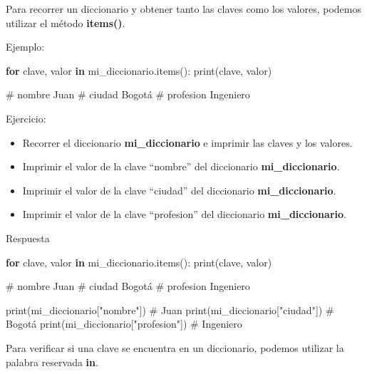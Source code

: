 \documentclass[
  a4paper,
  DIV=11,
  numbers=noendperiod,
  onepage,
  openany]{scrreprt}
\newenvironment{Shaded}{\begin{snugshade}}{\end{snugshade}}
\newcommand{\BuiltInTok}[1]{\textcolor[rgb]{0.00,0.23,0.31}{#1}}
\newcommand{\CommentTok}[1]{\textcolor[rgb]{0.37,0.37,0.37}{#1}}
\newcommand{\ControlFlowTok}[1]{\textcolor[rgb]{0.00,0.23,0.31}{\textbf{#1}}}
\newcommand{\KeywordTok}[1]{\textcolor[rgb]{0.00,0.23,0.31}{\textbf{#1}}}
\newcommand{\NormalTok}[1]{\textcolor[rgb]{0.00,0.23,0.31}{#1}}
\newcommand{\StringTok}[1]{\textcolor[rgb]{0.13,0.47,0.30}{#1}}
\providecommand{\tightlist}{%
  \setlength{\itemsep}{0pt}\setlength{\parskip}{0pt}}\usepackage{longtable,booktabs,array}
\begin{document}
Para recorrer un diccionario y obtener tanto las claves como los
valores, podemos utilizar el método \textbf{items()}.

Ejemplo:

\begin{Shaded}
\begin{Highlighting}[]
\ControlFlowTok{for}\NormalTok{ clave, valor }\KeywordTok{in}\NormalTok{ mi\_diccionario.items():}
    \BuiltInTok{print}\NormalTok{(clave, valor)}

\CommentTok{\# nombre Juan}
\CommentTok{\# ciudad Bogotá}
\CommentTok{\# profesion Ingeniero}
\end{Highlighting}
\end{Shaded}

Ejercicio:

\begin{itemize}
\tightlist
\item
  Recorrer el diccionario \textbf{mi\_diccionario} e imprimir las claves
  y los valores.
\item
  Imprimir el valor de la clave ``nombre'' del diccionario
  \textbf{mi\_diccionario}.
\item
  Imprimir el valor de la clave ``ciudad'' del diccionario
  \textbf{mi\_diccionario}.
\item
  Imprimir el valor de la clave ``profesion'' del diccionario
  \textbf{mi\_diccionario}.
\end{itemize}

Respuesta

\begin{Shaded}
\begin{Highlighting}[]
\ControlFlowTok{for}\NormalTok{ clave, valor }\KeywordTok{in}\NormalTok{ mi\_diccionario.items():}
    \BuiltInTok{print}\NormalTok{(clave, valor)}

\CommentTok{\# nombre Juan}
\CommentTok{\# ciudad Bogotá}
\CommentTok{\# profesion Ingeniero}

\BuiltInTok{print}\NormalTok{(mi\_diccionario[}\StringTok{"nombre"}\NormalTok{])  }\CommentTok{\# Juan}
\BuiltInTok{print}\NormalTok{(mi\_diccionario[}\StringTok{"ciudad"}\NormalTok{])  }\CommentTok{\# Bogotá}
\BuiltInTok{print}\NormalTok{(mi\_diccionario[}\StringTok{"profesion"}\NormalTok{])  }\CommentTok{\# Ingeniero}
\end{Highlighting}
\end{Shaded}

Para verificar si una clave se encuentra en un diccionario, podemos
utilizar la palabra reservada \textbf{in}.
\end{document}
